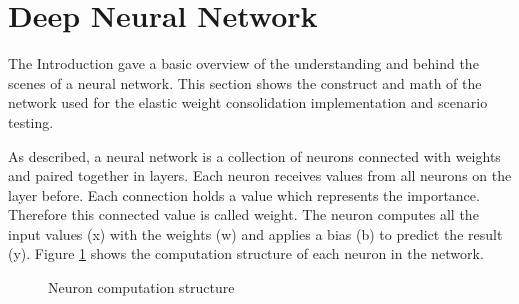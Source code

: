 \section{Deep Neural Network}

The Introduction gave a basic overview of the understanding and behind the scenes of a neural network.
This section shows the construct and math of the network used for the elastic weight consolidation implementation and scenario testing.

As described, a neural network is a collection of neurons connected with weights and paired together in layers.
Each neuron receives values from all neurons on the layer before.
Each connection holds a value which represents the importance.
Therefore this connected value is called weight.
The neuron computes all the input values (x) with the weights (w) and applies a bias (b) to predict the result (y).
Figure \ref{fig:dnn_node_procedure} shows the computation structure of each neuron in the network.
\cite{math_nn_skalski}

\begin{figure}[H]
    \centering
    \caption{\cite{dnn_neuron_basic_overview} Neuron computation structure}
    \label{fig:dnn_node_procedure}
\end{figure}

